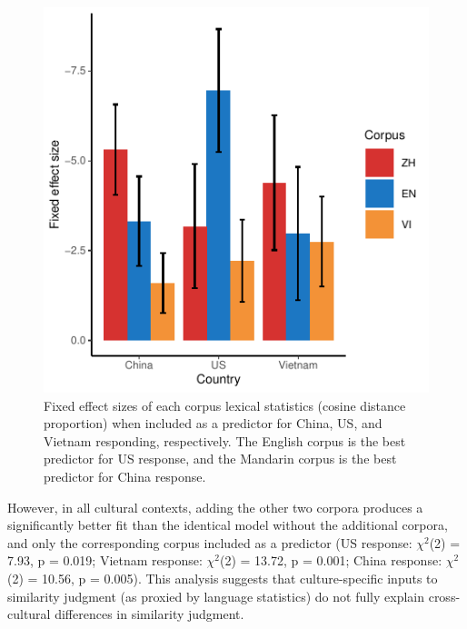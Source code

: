 \documentclass[10pt, letterpaper]{article}
\newenvironment{CodeChunk}{}{}
\begin{document}
\begin{CodeChunk}
\begin{figure}[tb]

{\centering \includegraphics{figs/unnamed-chunk-3-1} 

}

\caption[Fixed effect sizes of each corpus lexical statistics (cosine distance proportion) when included as a predictor for China, US, and Vietnam responding, respectively]{Fixed effect sizes of each corpus lexical statistics (cosine distance proportion) when included as a predictor for China, US, and Vietnam responding, respectively. The English corpus is the best predictor for US response, and the Mandarin corpus is the best predictor for China response.}\label{fig:unnamed-chunk-3}
\end{figure}
\end{CodeChunk}

However, in all cultural contexts, adding the other two corpora produces
a significantly better fit than the identical model without the
additional corpora, and only the corresponding corpus included as a
predictor (US response: \(\chi^2\)(2) = 7.93, p = 0.019; Vietnam
response: \(\chi^2\)(2) = 13.72, p = 0.001; China response:
\(\chi^2\)(2) = 10.56, p = 0.005). This analysis suggests that
culture-specific inputs to similarity judgment (as proxied by language
statistics) do not fully explain cross-cultural differences in
similarity judgment.
\end{document}
